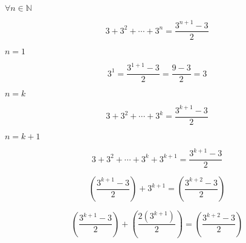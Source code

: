 \documentclass[10pt]{book}
\begin{document}
\begin{mdSnippets}
\begin{mdInlineSnippet}[775ac455dd1f9db047b23c9a57b437ac]%
$ \forall n \in \mathbb{N} $\end{mdInlineSnippet}%
\begin{mdDisplaySnippet}[7cd1e16d1f92476019233df7311bce8b]%
\[%
3 + 3^2 + \cdots + 3^n = \frac {3^{n+1} - 3} {2}
\]%
\end{mdDisplaySnippet}%
\begin{mdInlineSnippet}[ab78ccfbcd04b1ba22eb9427251cb20d]%
$n = 1$\end{mdInlineSnippet}%
\begin{mdDisplaySnippet}[a1f851db0ec848fc4d0e5a373cb2d682]%
\[%
3^1 = \frac {3^{1+1}-3} {2} = \frac {9-3} {2} = 3
\]%
\end{mdDisplaySnippet}%
\begin{mdInlineSnippet}[dc36071f824776cfcf54b119f4c1a163]%
$n = k$\end{mdInlineSnippet}%
\begin{mdDisplaySnippet}[e7a77b54672660e11e99338cf9752f92]%
\[%
3 + 3^2 + \cdots + 3^k = \frac {3^{k+1} - 3} {2}
\]%
\end{mdDisplaySnippet}%
\begin{mdInlineSnippet}[6db118b1df7f9211c7324569b51daf21]%
$n = k+1$\end{mdInlineSnippet}%
\begin{mdDisplaySnippet}%
\[%
3 + 3^2 + \cdots + 3^k + 3^{k+1}= \frac {3^{k+1} - 3} {2} 
\]%
\end{mdDisplaySnippet}%
\begin{mdDisplaySnippet}%
\[%
\left(\frac {3^{k+1} - 3} {2} \right) + 3^{k+1} = \left(\frac {3^{k+2}-3} {2} \right)
\]%
\end{mdDisplaySnippet}%
\begin{mdDisplaySnippet}[ddfda16876c14715c3f83f8b2fb1884e]%
\[%
\left(\frac {3^{k+1} - 3} {2} \right) +  \left(\frac{2(3^{k+1})} {2} \right) = \left(\frac {3^{k+2}-3} {2} \right) 
\]%
\end{mdDisplaySnippet}%

\end{mdSnippets}
\end{document}

